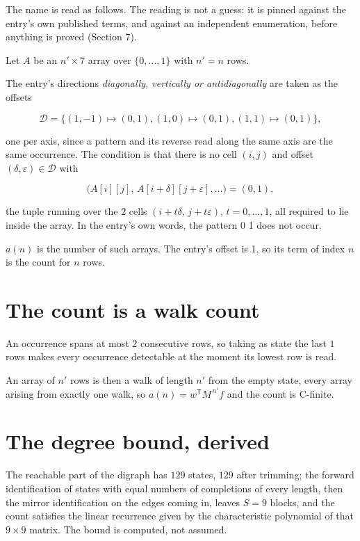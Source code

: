 \documentclass[11pt]{article}
\theoremstyle{definition}
\begin{document}
The name is read as follows. The reading is not a guess: it is pinned against the entry's own published terms, and against an independent enumeration, before anything is proved (Section 7).

Let $A$ be an $n' \times 7$ array over $\{0,\dots,1\}$ with $n' = n$ rows.

The entry's directions {\itshape diagonally, vertically or antidiagonally} are taken as the offsets

\[\mathcal{D} = \{(1,-1)\mapsto(0,1), (1,0)\mapsto(0,1), (1,1)\mapsto(0,1)\},\]

one per axis, since a pattern and its reverse read along the same axis are the same occurrence. The condition is that there is no cell $(i,j)$ and offset $(\delta,\varepsilon)\in\mathcal{D}$ with

\[\bigl(A[i][j],\,A[i{+}\delta][j{+}\varepsilon],\dots\bigr) = (0, 1),\]

the tuple running over the $2$ cells $(i+t\delta,\,j+t\varepsilon)$, $t = 0,\dots,1$, all required to lie inside the array. In the entry's own words, the pattern 0 1 does not occur.

$a(n)$ is the number of such arrays. The entry's offset is 1, so its term of index $n$ is the count for $n$ rows.

\section{The count is a walk count}

An occurrence spans at most $2$ consecutive rows, so taking as state the last $1$ rows makes every occurrence detectable at the moment its lowest row is read.

An array of $n'$ rows is then a walk of length $n'$ from the empty state, every array arising from exactly one walk, so $a(n) = w^{\mathsf T}M^{\,n'}f$ and the count is C-finite.

\section{The degree bound, derived}

The reachable part of the digraph has $129$ states, $129$ after trimming; the forward identification of states with equal numbers of completions of every length, then the mirror identification on the edges coming in, leaves $S = 9$ blocks, and the count satisfies the linear recurrence given by the characteristic polynomial of that $9\times9$ matrix. The bound is computed, not assumed.
\end{document}
